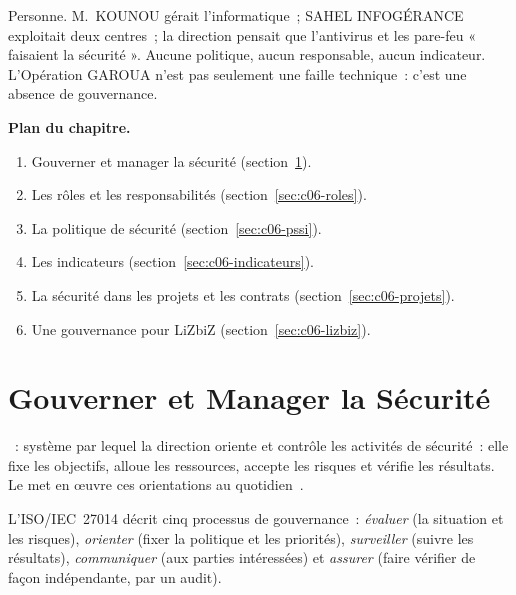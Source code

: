 Personne. M.~KOUNOU gérait l'informatique~; SAHEL INFOGÉRANCE exploitait
deux centres~; la direction pensait que l'antivirus et les pare-feu
« faisaient la sécurité ». Aucune politique, aucun responsable, aucun
indicateur. L'Opération GAROUA n'est pas seulement une faille technique~:
c'est une absence de gouvernance.

\medskip
\textbf{Plan du chapitre.}
\begin{enumerate}
    \item Gouverner et manager la sécurité (section~\ref{sec:c06-gouv}).
    \item Les rôles et les responsabilités (section~\ref{sec:c06-roles}).
    \item La politique de sécurité (section~\ref{sec:c06-pssi}).
    \item Les indicateurs (section~\ref{sec:c06-indicateurs}).
    \item La sécurité dans les projets et les contrats (section~\ref{sec:c06-projets}).
    \item Une gouvernance pour LiZbiZ (section~\ref{sec:c06-lizbiz}).
\end{enumerate}

\separateur

\section{Gouverner et Manager la Sécurité}
\label{sec:c06-gouv}

\begin{boxdef}
~: système par
lequel la direction oriente et contrôle les activités de sécurité~: elle
fixe les objectifs, alloue les ressources, accepte les risques et
vérifie les résultats. Le  met en
œuvre ces orientations au quotidien~\cite{iso27014_2020}.
\end{boxdef}

L'ISO/IEC~27014 décrit cinq processus de gouvernance~: \emph{évaluer}
(la situation et les risques), \emph{orienter} (fixer la politique et les
priorités), \emph{surveiller} (suivre les résultats), \emph{communiquer}
(aux parties intéressées) et \emph{assurer} (faire vérifier de façon
indépendante, par un audit).

